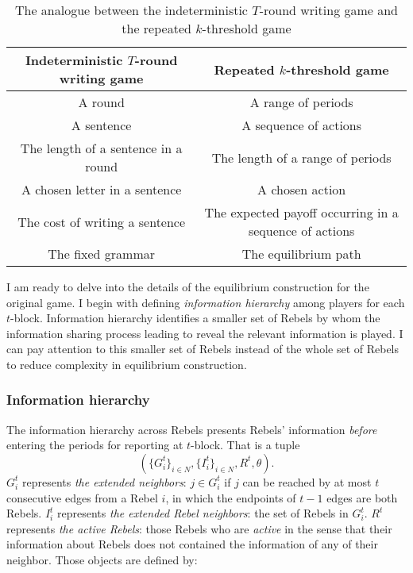 \documentclass[12pt,letter]{article}
\theoremstyle{definition}
\theoremstyle{remark}
\theoremstyle{claim}
\begin{document}
\begin{table}[!htbp]
\caption{The analogue between the indeterministic $T$-round writing game and the repeated $k$-threshold game}
\label{table:analogue}
\begin{center}
\begin{tabular}{cc }
Indeterministic $T$-round writing game & Repeated $k$-threshold game \\
\hline
\hline
A round & A range of periods\\
A sentence & A sequence of actions \\
The length of a sentence in a round & The length of a range of periods\\
A chosen letter in a sentence & A chosen action\\
The cost of writing a sentence & The expected payoff occurring in a sequence of actions\\
The fixed grammar & The equilibrium path\\
\hline
\end{tabular}
\end{center}

\end{table}



I am ready to delve into the details of the equilibrium construction for the original game. I begin with defining \textit{information hierarchy} among players for each $t$-block. Information hierarchy identifies a smaller set of Rebels by whom the information sharing process leading to reveal the relevant information is played. I can pay attention to this smaller set of Rebels instead of the whole set of Rebels to reduce complexity in equilibrium construction. 


\subsubsection{Information hierarchy}
\label{sec:info}
The information hierarchy across Rebels presents Rebels' information \textit{before} entering the periods for reporting at $t$-block. That is a tuple \[(\{G^{t}_i\}_{i\in N}, \{I^{t}_i\}_{i\in N}, R^t,\theta).\]
$G^{t}_i$ represents \textit{the extended neighbors}: $j\in G^{t}_i$ if $j$ can be reached by at most $t$ consecutive edges from a Rebel $i$, in which the endpoints of $t-1$ edges are both Rebels. $I^{t}_i$ represents \textit{the extended Rebel neighbors}: the set of Rebels in $G^t_i$. $R^t$ represents \textit{the active Rebels}: those Rebels who are \textit{active} in the sense that their information about Rebels does not contained the information of any of their neighbor. Those objects are defined by:
\end{document}

